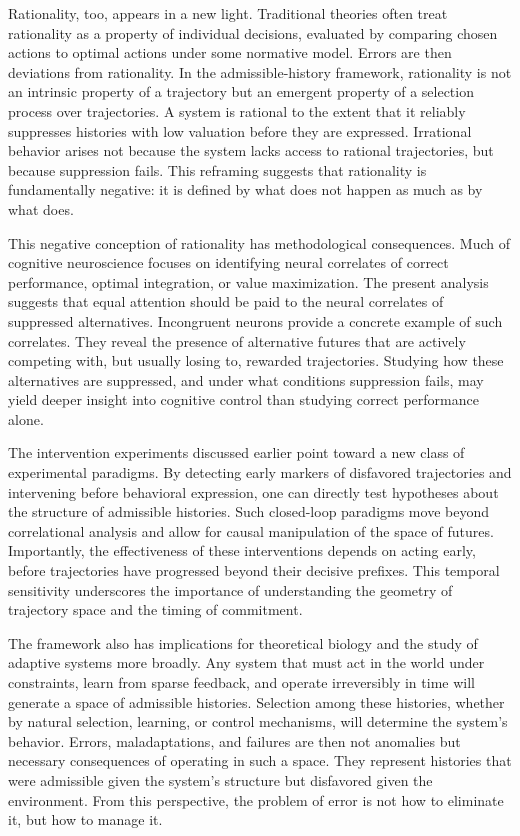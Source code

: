 \documentclass[11pt]{article}
\begin{document}
Rationality, too, appears in a new light. Traditional theories often treat rationality as a property of individual decisions, evaluated by comparing chosen actions to optimal actions under some normative model. Errors are then deviations from rationality. In the admissible-history framework, rationality is not an intrinsic property of a trajectory but an emergent property of a selection process over trajectories. A system is rational to the extent that it reliably suppresses histories with low valuation before they are expressed. Irrational behavior arises not because the system lacks access to rational trajectories, but because suppression fails. This reframing suggests that rationality is fundamentally negative: it is defined by what does not happen as much as by what does.

This negative conception of rationality has methodological consequences. Much of cognitive neuroscience focuses on identifying neural correlates of correct performance, optimal integration, or value maximization. The present analysis suggests that equal attention should be paid to the neural correlates of suppressed alternatives. Incongruent neurons provide a concrete example of such correlates. They reveal the presence of alternative futures that are actively competing with, but usually losing to, rewarded trajectories. Studying how these alternatives are suppressed, and under what conditions suppression fails, may yield deeper insight into cognitive control than studying correct performance alone.

The intervention experiments discussed earlier point toward a new class of experimental paradigms. By detecting early markers of disfavored trajectories and intervening before behavioral expression, one can directly test hypotheses about the structure of admissible histories. Such closed-loop paradigms move beyond correlational analysis and allow for causal manipulation of the space of futures. Importantly, the effectiveness of these interventions depends on acting early, before trajectories have progressed beyond their decisive prefixes. This temporal sensitivity underscores the importance of understanding the geometry of trajectory space and the timing of commitment.

The framework also has implications for theoretical biology and the study of adaptive systems more broadly. Any system that must act in the world under constraints, learn from sparse feedback, and operate irreversibly in time will generate a space of admissible histories. Selection among these histories, whether by natural selection, learning, or control mechanisms, will determine the system’s behavior. Errors, maladaptations, and failures are then not anomalies but necessary consequences of operating in such a space. They represent histories that were admissible given the system’s structure but disfavored given the environment. From this perspective, the problem of error is not how to eliminate it, but how to manage it.
\end{document}

